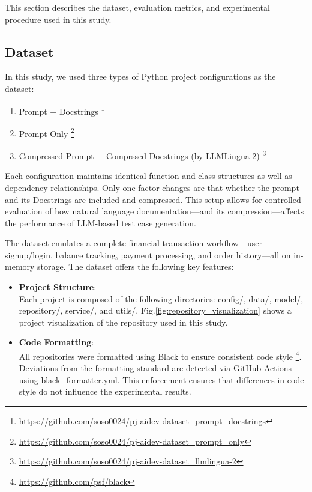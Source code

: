 This section describes the dataset, evaluation metrics, and experimental procedure used in this study.

\subsection{Dataset}

In this study, we used three types of Python project configurations as the dataset:

\begin{enumerate}
    \item Prompt + Docstrings \footnote{\url{https://github.com/soso0024/pj-aidev-dataset_prompt_docstrings}}
\vspace{0.2cm}
    \item Prompt Only \footnote{\url{https://github.com/soso0024/pj-aidev-dataset_prompt_only}}
\vspace{0.2cm}
    \item Compressed Prompt + Comprssed Docstrings (by LLMLingua-2) \footnote{\url{https://github.com/soso0024/pj-aidev-dataset_llmlingua-2}}
\end{enumerate}

Each configuration maintains identical function and class structures as well as dependency relationships. Only one factor changes are that whether the prompt and its Docstrings are included and compressed. This setup allows for controlled evaluation of how natural language documentation—and its compression—affects the performance of LLM-based test case generation. 

The dataset emulates a complete financial-transaction workflow—user signup/login, balance tracking, payment processing, and order history—all on in-memory storage. The dataset offers the following key features:

\begin{itemize}[label={$\bullet$}]
    \item \textbf{Project Structure}:\\Each project is composed of the following directories: config/, data/, model/, repository/, service/, and utils/. Fig.\ref{fig:repository_visualization} shows a project visualization of the repository used in this study.
\vspace{0.2cm}
    \item \textbf{Code Formatting}:\\All repositories were formatted using Black to ensure consistent code style \footnote{\url{https://github.com/psf/black}}. Deviations from the formatting standard are detected via GitHub Actions using black\_formatter.yml. This enforcement ensures that differences in code style do not influence the experimental results.
\end{itemize}

